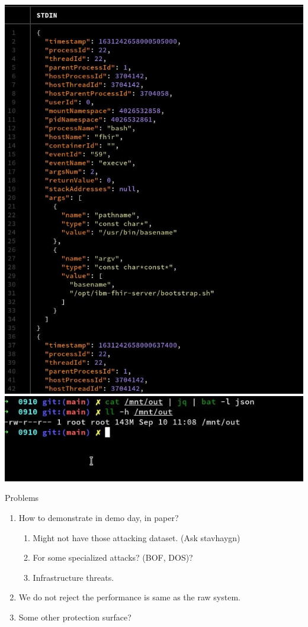 \documentclass{beamer}
\begin{document}
\begin{CJK*}{UTF8}{bsmi}
  \begin{frame}
    \begin{multicols*}{2}
      \includegraphics[height=.9\textheight]{photo_2021-09-10_14-04-25.jpg}
      \includegraphics[width=.45\textwidth]{photo_2021-09-10_14-04-30.jpg}
    \end{multicols*}
  \end{frame}

  \begin{frame}{Problems}
    \begin{enumerate}
      \item How to demonstrate in {demo day}, in {paper}?
            \begin{enumerate}
              \item Might not have those attacking dataset. (Ask stavhaygn)
              \item For some specialized attacks? (BOF, DOS)?
              \item Infrastructure threats.
            \end{enumerate}
      \item We do not reject the performance is same as the raw system.
      \item Some {\color{red} other protection surface}?
    \end{enumerate}
  \end{frame}

\end{CJK*}
\end{document}
